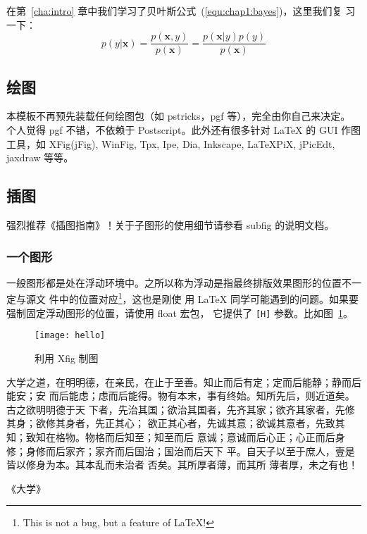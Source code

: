 在第~\ref{cha:intro} 章中我们学习了贝叶斯公式~(\ref{equ:chap1:bayes})，这里我们复
习一下：
\begin{equation}
\label{equ:chap2:bayes}
p(y|\mathbf{x}) = \frac{p(\mathbf{x},y)}{p(\mathbf{x})}=
\frac{p(\mathbf{x}|y)p(y)}{p(\mathbf{x})}
\end{equation}

\subsection{绘图}
\label{sec:draw}

本模板不再预先装载任何绘图包（如 \textsf{pstricks，pgf} 等），完全由你自己来决定。
个人觉得 \textsf{pgf} 不错，不依赖于 Postscript。此外还有很多针对 \LaTeX{} 的
 GUI 作图工具，如 XFig(jFig), WinFig, Tpx, Ipe, Dia, Inkscape, LaTeXPiX,
jPicEdt, jaxdraw 等等。

\subsection{插图}
\label{sec:graphs}

强烈推荐《\LaTeXe 插图指南》！关于子图形的使用细节请参看 \textsf{subfig} 的说明文档。

\subsubsection{一个图形}
\label{sec:onefig}
一般图形都是处在浮动环境中。之所以称为浮动是指最终排版效果图形的位置不一定与源文
件中的位置对应\footnote{This is not a bug, but a feature of \LaTeX!}，这也是刚使
用 \LaTeX{} 同学可能遇到的问题。如果要强制固定浮动图形的位置，请使用 \textsf{float} 宏包，
它提供了 \texttt{[H]} 参数。比如图~\ref{fig:xfig1}。
\begin{figure}[H] %
  \centering
  \texttt{[image: hello]}
  \caption{利用 Xfig 制图}
  \label{fig:xfig1}
\end{figure}

大学之道，在明明德，在亲民，在止于至善。知止而后有定；定而后能静；静而后能安；安
而后能虑；虑而后能得。物有本末，事有终始。知所先后，则近道矣。古之欲明明德于天
下者，先治其国；欲治其国者，先齐其家；欲齐其家者，先修其身；欲修其身者，先正其心；
欲正其心者，先诚其意；欲诚其意者，先致其知；致知在格物。物格而后知至；知至而后
意诚；意诚而后心正；心正而后身 修；身修而后家齐；家齐而后国治；国治而后天下
平。自天子以至于庶人，壹是皆以修身为本。其本乱而未治者 否矣。其所厚者薄，而其所
薄者厚，未之有也！

\hfill \pozhehao《大学》


